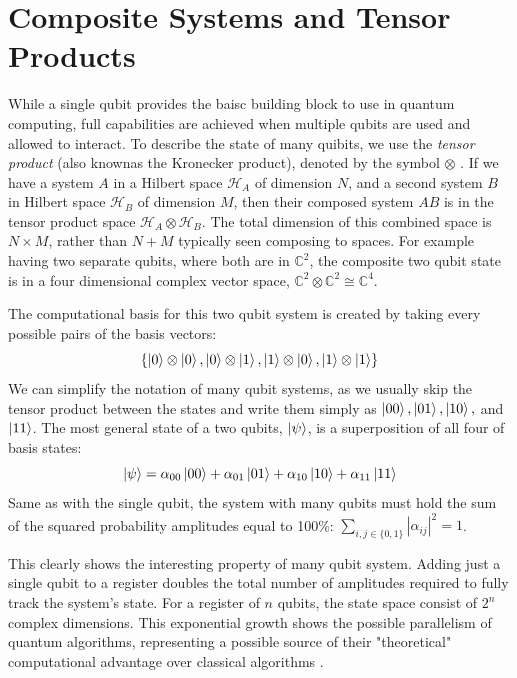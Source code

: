\section{Composite Systems and Tensor Products}

While a single qubit provides the baisc building block to use in quantum computing, full capabilities are achieved when 
multiple qubits are used and allowed to interact.
%
%
To describe the state of many quibits, we use the \textit{tensor product} (also knownas the Kronecker product), 
denoted by the symbol $\otimes$ \cite{nielsen2010quantum}.
%
%
If we have a system $A$ in a Hilbert space $\mathcal{H}_A$ of dimension $N$, 
and a second system $B$ in Hilbert space $\mathcal{H}_B$ of dimension $M$, 
then their composed system $AB$ is in the tensor product space $\mathcal{H}_A \otimes \mathcal{H}_B$.
%
%
The total dimension of this combined space is $N \times M$, rather than $N + M$ typically seen composing to spaces.
%
%
For example having two separate qubits, where both are in $\mathbb{C}^2$, 
the composite two qubit state is in a four dimensional complex vector space, 
$\mathbb{C}^2 \otimes \mathbb{C}^2 \cong \mathbb{C}^4$.
%
%

The computational basis for this two qubit system is created by taking every possible pairs of the basis vectors:
\bigskip
\begin{equation}
    \{\ket{0} \otimes \ket{0}, \ket{0} \otimes \ket{1}, \ket{1} \otimes \ket{0}, \ket{1} \otimes \ket{1}\}
\end{equation}
\bigskip
%
%
We can simplify the notation of many qubit systems, as we usually skip the tensor product between the states and write them simply as 
$\ket{00}, \ket{01}, \ket{10},$ and $\ket{11}$.
%
%
The most general state of a two qubits, $\ket{\psi}$, is a superposition of all four of basis states:
\bigskip
\begin{equation}
    \ket{\psi} = \alpha_{00}\ket{00} + \alpha_{01}\ket{01} + \alpha_{10}\ket{10} + \alpha_{11}\ket{11}
\end{equation}
\bigskip
Same as with the single qubit, the system with many qubits must hold the sum of the squared probability amplitudes equal to 100\%: 
$\sum_{i,j \in \{0,1\}} |\alpha_{ij}|^2 = 1$.
%
%

This clearly shows the interesting property of many qubit system. Adding just a single qubit to a register 
doubles the total number of amplitudes required to fully track the system's state.
%
%
For a register of $n$ qubits, the state space consist of $2^n$ complex dimensions.
%
%
This exponential growth shows the possible parallelism of quantum algorithms, 
representing a possible source of their "theoretical" computational advantage over classical algorithms \cite{arora2009computational}.